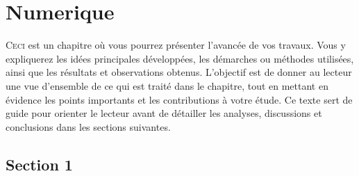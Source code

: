 

\graphicspath{{5_Images/5_Numerique/}}                          %
\makeatletter
{}                        %
\makeatother


\chapter{Numerique}\label{chap:Numerique}                       %

\begin{chapabstract}                                            %
    \lettrine[slope=0.5em,nindent=0.5em]{C}{eci}
    est un chapitre où vous pourrez présenter l’avancée de vos travaux. Vous y expliquerez les idées principales développées, les démarches ou méthodes utilisées, ainsi que les résultats et observations obtenus. L’objectif est de donner au lecteur une vue d’ensemble de ce qui est traité dans le chapitre, tout en mettant en évidence les points importants et les contributions à votre étude. Ce texte sert de guide pour orienter le lecteur avant de détailler les analyses, discussions et conclusions dans les sections suivantes.
\end{chapabstract}

\minitoc%
\newpage                                                        %


\section{Section 1}\label{sec:1_1}

